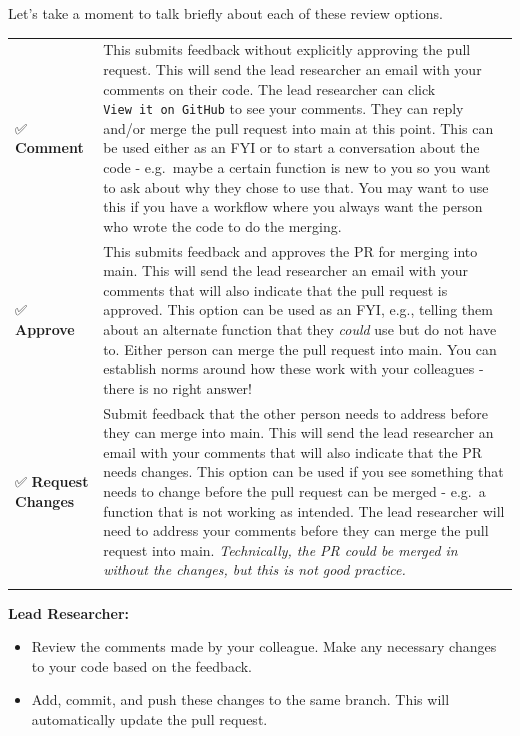\documentclass[
]{book}
\providecommand{\tightlist}{%
  \setlength{\itemsep}{0pt}\setlength{\parskip}{0pt}}
\begin{document}
Let's take a moment to talk briefly about each of these review options.

\begin{longtable}[]{@{}
  >{\raggedright\arraybackslash}p{}
  >{\raggedright\arraybackslash}p{}@{}}
\toprule\noalign{}
\endhead
\bottomrule\noalign{}
\endlastfoot
✅ \textbf{Comment} & This submits feedback without explicitly approving the pull request. This will send the lead researcher an email with your comments on their code. The lead researcher can click \texttt{View\ it\ on\ GitHub} to see your comments. They can reply and/or merge the pull request into main at this point. This can be used either as an FYI or to start a conversation about the code - e.g.~maybe a certain function is new to you so you want to ask about why they chose to use that. You may want to use this if you have a workflow where you always want the person who wrote the code to do the merging. \\
✅ \textbf{Approve} & This submits feedback and approves the PR for merging into main. This will send the lead researcher an email with your comments that will also indicate that the pull request is approved. This option can be used as an FYI, e.g., telling them about an alternate function that they \emph{could} use but do not have to. Either person can merge the pull request into main. You can establish norms around how these work with your colleagues - there is no right answer! \\
✅ \textbf{Request Changes} & Submit feedback that the other person needs to address before they can merge into main. This will send the lead researcher an email with your comments that will also indicate that the PR needs changes. This option can be used if you see something that needs to change before the pull request can be merged - e.g.~a function that is not working as intended. The lead researcher will need to address your comments before they can merge the pull request into main. \emph{Technically, the PR could be merged in without the changes, but this is not good practice.} \\
& \\
\end{longtable}

\textbf{Lead Researcher:}

\begin{itemize}
\tightlist
\item
  Review the comments made by your colleague. Make any necessary changes to your code based on the feedback.
\item
  Add, commit, and push these changes to the same branch. This will automatically update the pull request.
\end{itemize}
\end{document}
